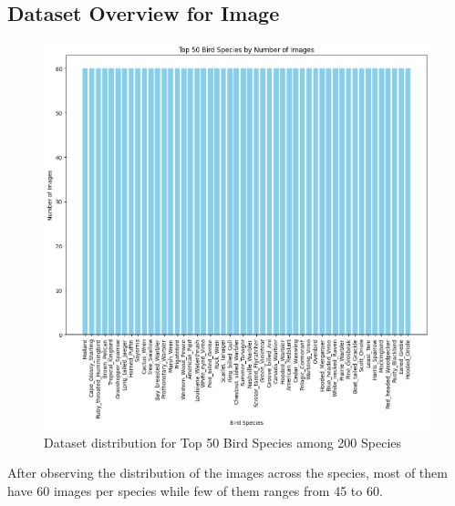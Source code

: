 \subsection{Dataset Overview for Image}
\begin{figure}[h!]
    \centering
    \includegraphics[scale=0.45]{images/cubdataset.png}
    \caption{Dataset distribution for Top 50 Bird Species among 200 Species}
\end{figure}
After observing the distribution of the images across the species, most of them have 60 images per species while few of them ranges from 45 to 60.

